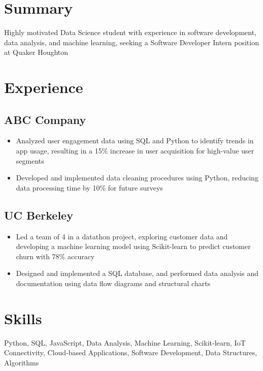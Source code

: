 \documentclass[11pt]{article}
\begin{document}
\section*{Summary}
Highly motivated Data Science student with experience in software development, data analysis, and machine learning, seeking a Software Developer Intern position at Quaker Houghton

\section*{Experience}
\subsection*{ABC Company}
\begin{itemize}
\item Analyzed user engagement data using SQL and Python to identify trends in app usage, resulting in a 15\% increase in user acquisition for high-value user segments
\item Developed and implemented data cleaning procedures using Python, reducing data processing time by 10\% for future surveys
\end{itemize}

\subsection*{UC Berkeley}
\begin{itemize}
\item Led a team of 4 in a datathon project, exploring customer data and developing a machine learning model using Scikit-learn to predict customer churn with 78\% accuracy
\item Designed and implemented a SQL database, and performed data analysis and documentation using data flow diagrams and structural charts
\end{itemize}

\section*{Skills}
Python, SQL, JavaScript, Data Analysis, Machine Learning, Scikit-learn, IoT Connectivity, Cloud-based Applications, Software Development, Data Structures, Algorithms
\end{document}
